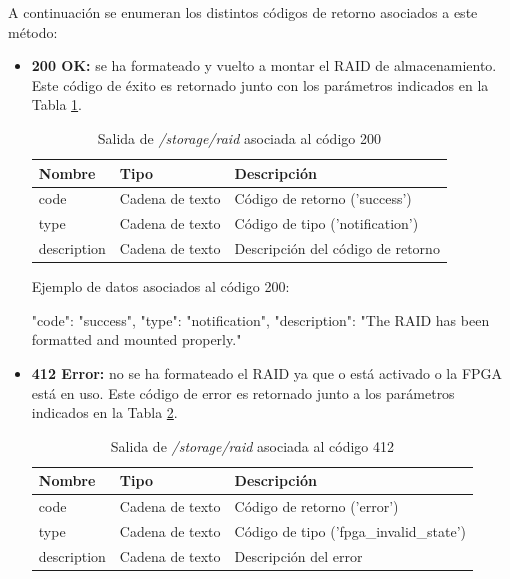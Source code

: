 A continuación se enumeran los distintos códigos de retorno asociados a este método:
\begin{itemize}

\item{\textbf{200 OK:} se ha formateado y vuelto a montar el \gls{RAID} de almacenamiento. Este código de éxito es retornado junto con los parámetros indicados en la Tabla \ref{extra:api:storageraid:ok}.
\begin{table}[H]
\centering
\begin{tabular}{|l|l|l|}
\hline
\rowcolor[HTML]{F5F5F5}
\textbf{Nombre}  & \textbf{Tipo}   & \textbf{Descripción}              \\ \hline
code             & Cadena de texto & Código de retorno ('success')     \\ \hline
type             & Cadena de texto & Código de tipo ('notification')   \\ \hline
description      & Cadena de texto & Descripción del código de retorno \\ \hline
\end{tabular}
\caption{Salida de \textit{/storage/raid} asociada al código 200}
\label{extra:api:storageraid:ok}
\end{table}
\begin{minipage}{\textwidth}
Ejemplo de datos asociados al código 200:

\begin{code}[language=json]
{
  "code": "success",
  "type": "notification",
  "description": "The RAID has been formatted and mounted properly."
}
\end{code}
\end{minipage}
}

\item{\textbf{412 Error:} no se ha formateado el \gls{RAID} ya que o está activado o la \gls{FPGA} está en uso. Este código de error es retornado junto a los parámetros indicados en la Tabla \ref{extra:api:storageraid:error}.
\begin{table}[H]
\centering
\begin{tabular}{|l|l|l|}
\hline
\rowcolor[HTML]{F5F5F5}
\textbf{Nombre}  & \textbf{Tipo}   & \textbf{Descripción}                    \\ \hline
code             & Cadena de texto & Código de retorno ('error')             \\ \hline
type             & Cadena de texto & Código de tipo ('fpga\_invalid\_state') \\ \hline
description      & Cadena de texto & Descripción del error                   \\ \hline
\end{tabular}
\caption{Salida de \textit{/storage/raid} asociada al código 412}
\label{extra:api:storageraid:error}
\end{table}

}
\end{itemize}
